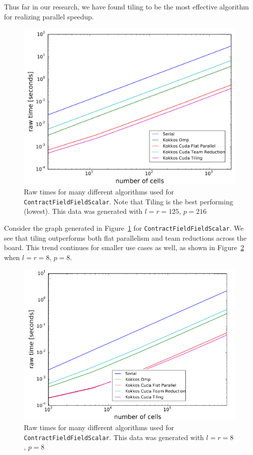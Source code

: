Thus far in our research, we have found tiling to be the most effective
algorithm for realizing parallel speedup. 

\begin{figure}[H]
    \centering
\includegraphics[width=5in]{CFFS_RawTimes_LR125P216_2.PNG} 
\caption[\texttt{ContractFieldFieldScalar} performance summary (large)]{Raw times
    for many different algorithms used for \texttt{ContractFieldFieldScalar}.
    Note that Tiling is the best performing (lowest). This data was generated
    with
    $l=r=125$, $p=216$}
\label{fig:TilingPerformance}
\end{figure}
Consider the graph generated in Figure~\ref{fig:TilingPerformance} for \texttt{ContractFieldFieldScalar}. We see that tiling outperforms both flat parallelism and team reductions across the board. This trend continues for smaller use cases as well, as shown in Figure~\ref{fig:TilingPerformance2} when $l = r = 8$, $p = 8$.

\begin{figure}[H]
    \centering
    \includegraphics[width=5in]{CFFS_RawTimes_LRP8_2.PNG}
    \caption[\texttt{ContractFieldFieldScalar} performance summary (small)]{Raw
        times for many different algorithms used for \texttt{ContractFieldFieldScalar}.
        This data was generated with $l=r=8$, $p=8$}
\label{fig:TilingPerformance2}
\end{figure}

